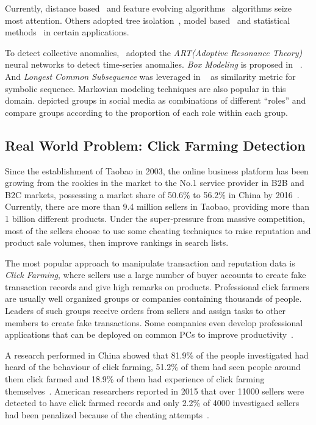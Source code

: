 \documentclass[a4paper]{IEEEtran}
\begin{document}
			Currently, distance based~\cite{cao2014scalable,cao2017multi} and feature evolving algorithms~\cite{masud2013classification,li2015discovery,shao2014prototype} algorithms seize most attention. Others adopted tree isolation~\cite{zhang2017lshiforest}, model based~\cite{yin2016model} and statistical methods~\cite{zhu2002statstream} in certain applications.
			
			To detect collective anomalies,~\cite{caudell1993adaptive} adopted the \textit{ART(Adoptive Resonance Theory)} neural networks to detect time-series anomalies. \textit{Box Modeling} is proposed in ~\cite{chan2005modeling}. And \textit{Longest Common Subsequence} was leveraged in ~\cite{budalakoti2006anomaly} as similarity metric for symbolic sequence. Markovian modeling techniques are also popular in this domain\cite{ye2000markov,warrender1999detecting,pavlov2003sequence}. \cite{yu2015glad} depicted groups in social media as combinations of different ``roles'' and compare groups according to the proportion of each role within each group.
			
		\subsection{Real World Problem: Click Farming Detection}\label{sec:related-realworld}
			Since the establishment of Taobao in 2003, the online business platform has been growing from the rookies in the market to the No.1 service provider in B2B and B2C markets, possessing a market share of 50.6\% to 56.2\% in China by 2016~\cite{iresearch2016b2c}. Currently, there are more than 9.4 million sellers in Taobao, providing more than 1 billion different products. Under the super-pressure from massive competition, most of the sellers choose to use some cheating techniques to raise reputation and product sale volumes, then improve rankings in search lists.
			
			The most popular approach to manipulate transaction and reputation data is \textit{Click Farming}, where sellers use a large number of buyer accounts to create fake transaction records and give high remarks on products. Professional click farmers are usually well organized groups or companies containing thousands of people. Leaders of such groups receive orders from sellers and assign tasks to other members to create fake transactions. Some companies even develop professional applications that can be deployed on common PCs to improve productivity~\cite{zhao2016on}.
			
			A research performed in China showed that 81.9\% of the people investigated had heard of the behaviour of click farming, 51.2\% of them had seen people around them click farmed and 18.9\% of them had experience of click farming themselves~\cite{yan2015report}. American researchers reported in 2015 that over 11000 sellers were detected to have click farmed records and only 2.2\% of 4000 investigaed sellers had been penalized because of the cheating attempts~\cite{netease2015research}.
			
\end{document}
